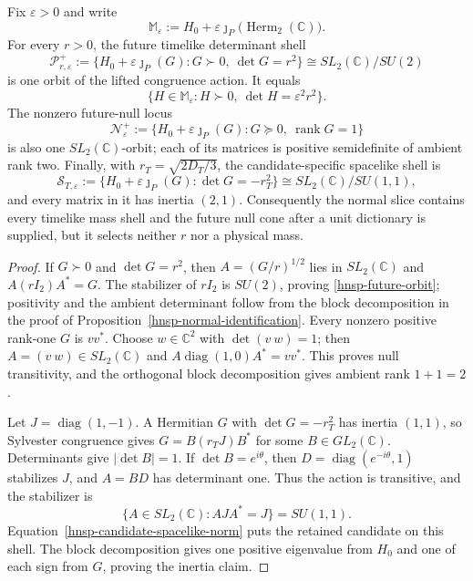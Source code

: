 \begin{theorem}
\label{hnsp-determinant-orbit-geometry}
Fix \(\varepsilon>0\) and write
\[
 \mathbb M_\varepsilon
 :=H_0+\varepsilon\jmath_P\bigl(\operatorname{Herm}_2(\mathbb C)\bigr).
\]
For every \(r>0\), the future timelike determinant shell
\begin{equation}
 \mathscr P^+_{r,\varepsilon}
 :=\{H_0+\varepsilon\jmath_P(G):G\succ0,\ \det G=r^2\}
 \cong SL_2(\mathbb C)/SU(2)
 \label{hnsp-future-orbit}
\end{equation}
is one orbit of the lifted congruence action.  It equals
\[
 \{H\in\mathbb M_\varepsilon:H\succ0,\
   \det H=\varepsilon^2r^2\}.
\]
The nonzero future-null locus
\begin{equation}
 \mathscr N^+_\varepsilon
 :=\{H_0+\varepsilon\jmath_P(G):
       G\succeq0,\ \operatorname{rank}G=1\}
 \label{hnsp-null-orbit}
\end{equation}
is also one \(SL_2(\mathbb C)\)-orbit; each of its matrices is positive
semidefinite of ambient rank two.  Finally, with
\(r_T=\sqrt{2D_T/3}\), the candidate-specific spacelike shell is
\begin{equation}
 \mathscr S_{T,\varepsilon}
 :=\{H_0+\varepsilon\jmath_P(G):\det G=-r_T^2\}
 \cong SL_2(\mathbb C)/SU(1,1),
 \label{hnsp-spacelike-orbit}
\end{equation}
and every matrix in it has inertia \((2,1)\).  Consequently the normal slice
contains every timelike mass shell and the future null cone after a unit
dictionary is supplied, but it selects neither \(r\) nor a physical mass.
\end{theorem}

\begin{proof}
If \(G\succ0\) and \(\det G=r^2\), then
\(A=(G/r)^{1/2}\) lies in \(SL_2(\mathbb C)\) and
\(A(rI_2)A^*=G\).  The stabilizer of \(rI_2\) is \(SU(2)\), proving
\eqref{hnsp-future-orbit}; positivity and the ambient determinant follow from
the block decomposition in the proof of
Proposition~\ref{hnsp-normal-identification}.  Every nonzero positive
rank-one \(G\) is \(vv^*\).  Choose \(w\in\mathbb C^2\) with
\(\det(v\ w)=1\); then \(A=(v\ w)\in SL_2(\mathbb C)\) and
\(A\operatorname{diag}(1,0)A^*=vv^*\).  This proves null transitivity, and the
orthogonal block decomposition gives ambient rank \(1+1=2\).

Let \(J=\operatorname{diag}(1,-1)\).  A Hermitian \(G\) with
\(\det G=-r_T^2\) has inertia \((1,1)\), so Sylvester congruence gives
\(G=B(r_T J)B^*\) for some \(B\in GL_2(\mathbb C)\).  Determinants give
\(|\det B|=1\).  If \(\det B=e^{i\theta}\), then
\(D=\operatorname{diag}(e^{-i\theta},1)\) stabilizes \(J\), and
\(A=BD\) has determinant one.  Thus the action is transitive, and the
stabilizer is
\[
 \{A\in SL_2(\mathbb C):AJA^*=J\}=SU(1,1).
\]
Equation~\eqref{hnsp-candidate-spacelike-norm} puts the retained candidate on
this shell.  The block decomposition gives one positive eigenvalue from
\(H_0\) and one of each sign from \(G\), proving the inertia claim.
\end{proof}

